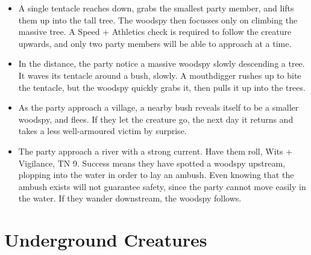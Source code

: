 \begin{multicols}{2}
\begin{itemize}

  \item{A single tentacle reaches down, grabs the smallest party member, and lifts them up into the tall tree.
  The woodspy then focusses only on climbing the massive tree.
  A Speed + Athletics check is required to follow the creature upwards, and only two party members will be able to approach at a time.}
  \item{In the distance, the party notice a massive woodspy slowly descending a tree.
  It waves its tentacle around a bush, slowly.
  A mouthdigger rushes up to bite the tentacle, but the woodspy quickly grabs it, then pulls it up into the trees.}
  \item{As the party approach a village, a nearby bush reveals itself to be a smaller woodspy, and flees.
  If they let the creature go, the next day it returns and takes a less well-armoured victim by surprise.}
  \item{The party approach a river with a strong current.
  Have them roll, Wits + Vigilance, TN 9.
  Success means they have spotted a woodspy upstream, plopping into the water in order to lay an ambush.
  Even knowing that the ambush exists will not guarantee safety, since the party cannot move easily in the water.
  If they wander downstream, the woodspy follows.}

\end{itemize}

\end{multicols}

\section{Underground Creatures}


